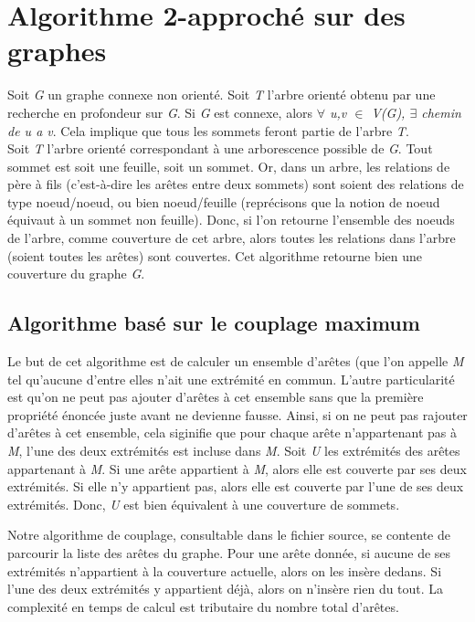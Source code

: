 
\section{Algorithme 2-approch\'e sur des graphes}

Soit \textit{G} un graphe connexe non orient\'e. Soit \textit{T} l'arbre orient\'e obtenu par une recherche en profondeur sur \textit{G}.
Si \textit{G} est connexe, alors \textit{$\forall$ u,v $\in$ V(G), $\exists$ chemin de u a v}. Cela implique que tous les sommets
feront partie de l'arbre \textit{T}.\\

Soit \textit{T} l'arbre orient\'e correspondant \`a une arborescence possible de \textit{G}. Tout sommet est soit une feuille,
soit un sommet. Or, dans un arbre, les relations de p\`ere \`a fils (c'est-\`a-dire les ar\^etes entre deux sommets) sont soient
des relations de type noeud/noeud, ou bien noeud/feuille (repr\'ecisons que la notion de noeud \'equivaut \`a un sommet non feuille).
Donc, si l'on retourne l'ensemble des noeuds de l'arbre, comme couverture de cet arbre, alors toutes les relations dans l'arbre (soient
toutes les ar\^etes) sont couvertes. Cet algorithme retourne bien une couverture du graphe \textit{G}.


\subsection{Algorithme bas\'e sur le couplage maximum}

Le but de cet algorithme est de calculer un ensemble d'ar\^etes (que l'on appelle \textit{M} tel qu'aucune d'entre elles n'ait une
extr\'emit\'e en commun. L'autre particularit\'e est qu'on ne peut pas ajouter d'ar\^etes \`a cet ensemble sans que la premi\`ere
propri\'et\'e \'enonc\'ee juste avant ne devienne fausse. Ainsi, si on ne peut pas rajouter d'ar\^etes \`a cet ensemble, cela siginifie
que pour chaque ar\^ete n'appartenant pas \`a \textit{M}, l'une des deux extr\'emit\'es est incluse dans \textit{M}. Soit \textit{U} les
extr\'emit\'es des ar\^etes appartenant \`a \textit{M}. Si une ar\^ete appartient \`a \textit{M}, alors elle est couverte par ses
deux extr\'emit\'es. Si elle n'y appartient pas, alors elle est couverte par l'une de ses deux extr\'emit\'es. Donc, \textit{U}
est bien \'equivalent \`a une couverture de sommets.

Notre algorithme de couplage, consultable dans le fichier source, se contente de parcourir la liste des ar\^etes du graphe. Pour une ar\^ete
donn\'ee, si aucune de ses extr\'emit\'es n'appartient \`a la couverture actuelle, alors on les ins\`ere dedans. Si l'une des deux extr\'emit\'es
y appartient d\'ej\`a, alors on n'ins\`ere rien du tout. La complexit\'e en temps de calcul est tributaire du nombre total d'ar\^etes.

